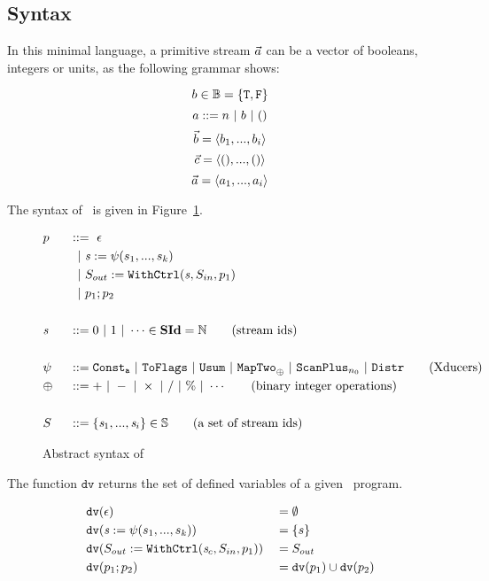 \subsection{Syntax}
In this minimal language, a primitive stream $\vec a$ can be a vector of booleans, integers or units, as the following grammar shows:

$$b \in \mathbb{B} = \{\mathtt{T},\mathtt{F} \}$$
$$ a ::= n \ | \ b \ | \ ()$$
$$\vec b = \langle b_1,...,b_i \rangle$$ 
$$\vec c = \langle (),...,() \rangle $$
$$\vec a = \langle a_1,...,a_i \rangle  $$ 

\hspace{1cm}

The syntax of \fmsvcode \  is given in Figure~\ref{fig-svcode-grammar}.


\begin{figure}[H] \large
	\begin{alignat*}{2}
	&p  && :: = \ \epsilon \\ 
	&   &&\ \ | \ \mathit{s} := \psi(s_1,...,s_k) \\
	&   &&\ \ | \ S_{out} := \mathtt{WithCtrl}(\mathit{s},S_{in},p_1) \\
	&   &&\ \ | \ p_1;p_2  \\
	\\
	&\mathit{s} && ::= 0 \ | \ 1 \ | \ \cdots \in \mathbf{SId}  = \mathbb{N}   \tag{stream ids}\\
	\\
	& \psi \ && ::= \mathtt{Const_{a}} \ | \ \mathtt{ToFlags}  
	\ | \ \mathtt{Usum} \ | \ \mathtt{MapTwo}_{\oplus} \ | \ \mathtt{ScanPlus}_{n_0} \ | \ \mathtt{Distr}  \tag{Xducers} \\
	& \oplus \ && :: = + \ | \ - \ | \ \times \ | \ / \ | \ \% \ | \ \cdots  \tag{binary integer operations}\\
	\\
	&  S && ::= \{\mathit{s}_1,..., \mathit{s}_i\} \in \mathbb{S}  \tag{a set of stream ids}
	\end{alignat*}
	\caption{Abstract syntax of \fmsvcode \  \label{fig-svcode-grammar}}

\end{figure}


The function $\texttt{dv}$ returns the set of defined variables of a given \fmsvcode \  program.

\begin{alignat*}{2}
&\mathtt{dv}(\epsilon) && =  \emptyset \\
&\mathtt{dv}(\mathit{s} := \psi(s_1,...,s_k)) && =  \{s\} \\
&\mathtt{dv}(S_{out} := \mathtt{WithCtrl}(\mathit{s}_c,S_{in},p_1)) && =   S_{out} \\
&\mathtt{dv}(p_1;p_2) && =  \mathtt{dv}(p_1) \cup \mathtt{dv}(p_2) \\
\end{alignat*}

